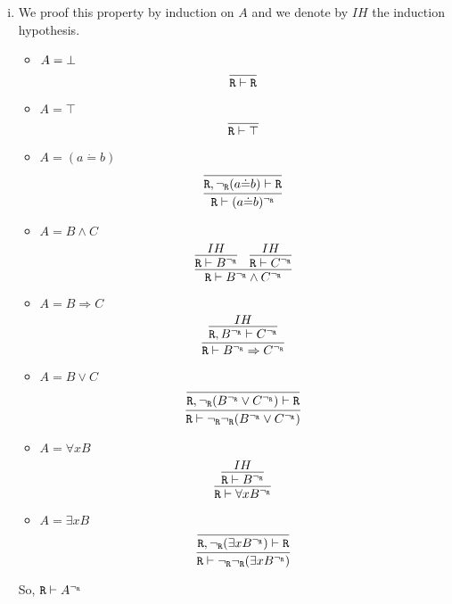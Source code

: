 \begin{enumerate}[(i)]
    \item We proof this property by induction on $A$ and we denote by $IH$ the induction hypothesis.
    \begin{itemize}
        \item $A=\bot$
            $$
                \infer{
                    \R \vdash \R
                }{
                }
            $$
        \item $A=\top$
            $$
                \infer{
                    \R \vdash \top
                }{
                }
            $$
        \item $A=(a \dot{=} b)$
            $$
                \infer{
                    \R \vdash (a \dot{=} b)^\ngr
                }{
                    \infer{
                        \R, \ngr(a \dot{=} b) \vdash \R
                    }{
                    }
                }
            $$
        \item $A=B\wedge C$
            $$
                \infer{
                    \R \vdash B^\ngr \wedge C^\ngr
                }{
                    \infer{
                        \R \vdash B^\ngr
                    }{
                        IH
                    }&
                    \infer{
                        \R \vdash C^\ngr
                    }{
                        IH
                    }
                }
            $$
        \item $A=B \Rightarrow C$
            $$
                \infer{
                    \R \vdash B^\ngr \Rightarrow C^\ngr
                }{
                    \infer{
                        \R, B^\ngr \vdash C^\ngr
                    }{
                        IH
                    }
                }
            $$
        \item $A=B \vee C$
            $$
                \infer{
                    \R \vdash \ngr\ngr(B^\ngr \vee C^\ngr)
                }{
                    \infer{
                        \R, \ngr(B^\ngr \vee C^\ngr) \vdash \R
                    }{
                    }
                }
            $$
        \item $A=\forall x B$
            $$
                \infer{
                    \R \vdash \forall x B^\ngr
                }{
                    \infer{
                        \R \vdash B^\ngr
                    }{
                        IH
                    }
                }
            $$
        \item $A=\exists x B$
            $$
                \infer{
                    \R \vdash \ngr\ngr(\exists x B^\ngr)
                }{
                    \infer{
                        \R, \ngr(\exists x B^\ngr) \vdash \R
                    }{
                    }
                }
            $$
    \end{itemize}
    So, $\texttt{R}\vdash A^{\neg_{\texttt{R}}}$
    

\end{enumerate}

